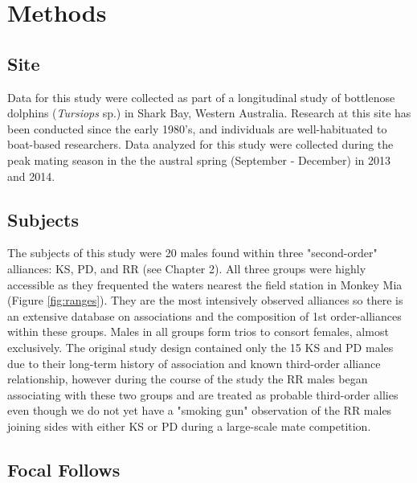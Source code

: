 \documentclass[11pt]{amsart}
\begin{document}

\section{Methods}

\subsection{Site}
Data for this study were collected as part of a longitudinal study of bottlenose dolphins (\textit{Tursiops} sp.) in Shark Bay, Western Australia. Research at this site has been conducted since the early 1980's, and individuals are well-habituated to boat-based researchers. Data analyzed for this study were collected during the peak mating season in the the austral spring (September - December) in 2013 and 2014. 

\subsection{Subjects}
The subjects of this study were 20 males found within three "second-order" alliances: KS, PD, and RR (see Chapter 2).  All three groups were highly accessible as they frequented the waters nearest the field station in Monkey Mia (Figure \ref{fig:ranges}). They are the most intensively observed alliances so there is an extensive database on associations and the composition of 1st order-alliances within these groups. Males in all groups form trios to consort females, almost exclusively. The original study design contained only the 15 KS and PD males due to their long-term history of association and known third-order alliance relationship, however during the course of the study the RR males began associating with these two groups and are treated as probable third-order allies even though we do not yet have a "smoking gun" observation of the RR males joining sides with either KS or PD during a large-scale mate competition. 

\subsection{Focal Follows}
\end{document}
